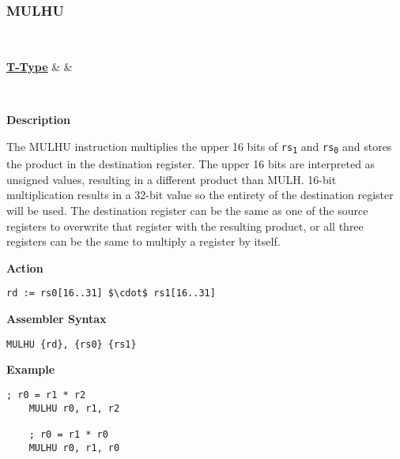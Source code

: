 \subsubsection{MULHU }\label{sec:MULHU}

\vspace{3ex}

\begin{center}
	\begin{bytefield}[leftcurly=., leftcurlyspace=0pt]{32}
		 \\
		\begin{leftwordgroup}{\hyperref[sec:t-type]{\textbf{T-Type}}}
		 & 
		 &
		\end{leftwordgroup}\\
	\end{bytefield}
\end{center}

\textbf{Description}

The MULHU instruction multiplies the upper 16 bits of \texttt{rs\textsubscript{1}} and \texttt{rs\textsubscript{0}} and stores the product in the destination register.
The upper 16 bits are interpreted as unsigned values, resulting in a different product than MULH.
16-bit multiplication results in a 32-bit value so the entirety of the destination register will be used.
The destination register can be the same as one of the source registers to overwrite that register with the resulting product,
or all three registers can be the same to multiply a register by itself.
\vspace{3ex}

\textbf{Action}
\begin{lstlisting}[frame=single]
	rd := rs0[16..31] $\cdot$ rs1[16..31]
\end{lstlisting}

\vspace{3ex}

\textbf{Assembler Syntax}
\begin{lstlisting}[frame=single]
	MULHU {rd}, {rs0} {rs1}
\end{lstlisting}

\vspace{3ex}

\textbf{Example}
\begin{lstlisting}[frame=single]
	; r0 = r1 * r2
	MULHU r0, r1, r2
	
	; r0 = r1 * r0
	MULHU r0, r1, r0
\end{lstlisting}

